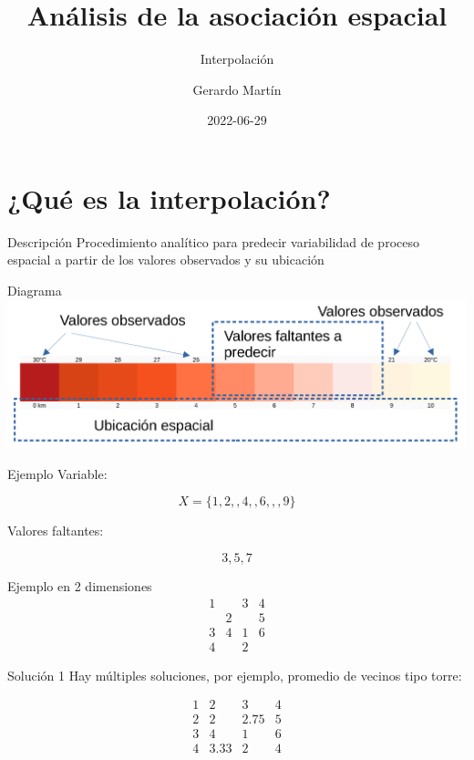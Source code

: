 \documentclass[
  11pt,
  ignorenonframetext,
]{beamer}
\title{Análisis de la asociación espacial}
\subtitle{Interpolación}
\author{Gerardo Martín}
\date{2022-06-29}
\begin{document}
\frame{\titlepage}

\hypertarget{quuxe9-es-la-interpolaciuxf3n}{%
\section{¿Qué es la
interpolación?}\label{quuxe9-es-la-interpolaciuxf3n}}

\begin{frame}{Descripción}
\protect\hypertarget{descripciuxf3n}{}
Procedimiento analítico para predecir variabilidad de proceso espacial a
partir de los valores observados y su ubicación
\end{frame}

\begin{frame}{Diagrama}
\protect\hypertarget{diagrama}{}
\includegraphics{Interpolacion/Interpolacion}
\end{frame}

\begin{frame}{Ejemplo}
\protect\hypertarget{ejemplo}{}
Variable:

\[X = \{1, 2, , 4, , 6, , , 9 \}\]

Valores faltantes:

\[3, 5, 7\]
\end{frame}

\begin{frame}{Ejemplo en 2 dimensiones}
\protect\hypertarget{ejemplo-en-2-dimensiones}{}
\[\begin{matrix}
1 &   & 3 & 4 \\
  & 2 &   & 5 \\
3 & 4 & 1 & 6 \\
4 &   & 2 & 
\end{matrix}\]
\end{frame}

\begin{frame}{Solución 1}
\protect\hypertarget{soluciuxf3n-1}{}
Hay múltiples soluciones, por ejemplo, promedio de vecinos tipo torre:

\[\begin{matrix}
1 & 2 & 3 & 4 \\
2 & 2 & 2.75 & 5 \\
3 & 4 & 1 & 6 \\
4 & 3.33 & 2 & 4
\end{matrix}\]
\end{frame}
\end{document}
